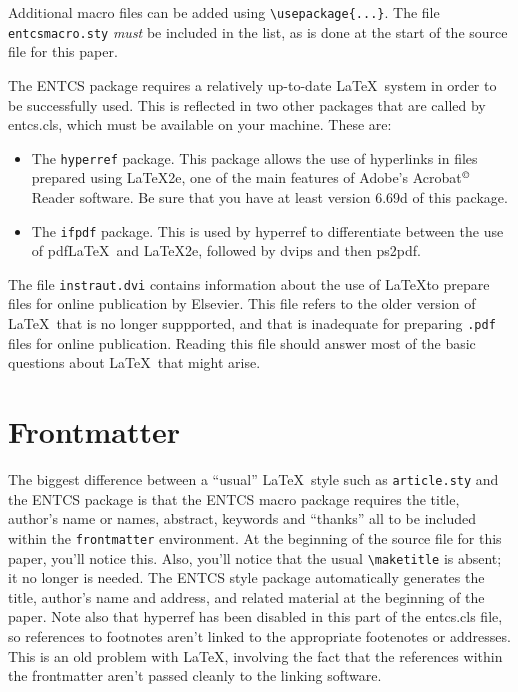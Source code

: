 \documentclass{entcs} \usepackage{entcsmacro}
\begin{document}
Additional macro files can be added using \verb+\usepackage{...}+.
The file \texttt{entcs\-macro.sty} \emph{must} be included in the
list, as is done at the start of the source file for this paper.

The ENTCS package requires a relatively up-to-date \LaTeX\ system in
order to be successfully used. This is reflected in two other packages
that are called by entcs.cls, which must be available on your machine.
These are:
\begin{itemize}
\item The \texttt{hyperref} package. This package allows the use of
  hyperlinks in files prepared using \LaTeX 2e, one of the main
  features of Adobe's Acrobat$^{\tiny
  \copyright}$ Reader software. Be sure that you 
  have at least version 6.69d of this package. 
\item The \texttt{ifpdf} package. This is used by hyperref to
  differentiate between the use of pdf\LaTeX\ and \LaTeX 2e, followed
  by dvips and then ps2pdf. 
\end{itemize}

The file \texttt{instraut.dvi} contains information about the use of
\LaTeX to prepare files for online publication by Elsevier. This file
refers to the older version of \LaTeX\ that is no longer suppported,
and that is inadequate for preparing \texttt{.pdf} files for online
publication. Reading this file should answer most of the basic
questions about \LaTeX\ that might arise.

\section{Frontmatter}
The biggest difference between a ``usual'' \LaTeX\ style such as
\texttt{article.sty} and the ENTCS package is that the ENTCS macro
package requires the title, author's name or names, abstract, keywords
and ``thanks'' all to be included within the \texttt{frontmatter}
environment.  At the beginning of the source file for this paper,
you'll notice this.  Also, you'll notice that the usual
\verb+\maketitle+ is absent; it no longer is needed.  The ENTCS style
package automatically generates the title, author's name and address,
and related material at the beginning of the paper. Note also that
hyperref has been disabled in this part of the entcs.cls file, so
references to footnotes aren't linked to the appropriate footenotes or
addresses. This is an old problem with \LaTeX, involving the fact that
the references within the frontmatter aren't passed cleanly to the
linking software. 
\end{document}
